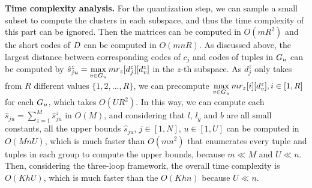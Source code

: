  
 
 
 

 
 
 \noindent \textbf{Time complexity analysis.}
 For the quantization step, we can sample a small subset to compute the clusters in each subspace, and thus the time complexity of this part can be ignored. 
 Then the matrices can be computed in $O(mR^2)$ and the short codes of $D$ can be computed in $O(mnR)$. 
 As discussed above,  the largest distance between corresponding codes of  $c_j$ and codes of tuples in $G_u$ can be computed by $\hat{s}_{ju}^z = \max\limits_{v\in G_u}mr_z[d_{j}^z][d_v^z]$ in the $z$-th subspace. 
 As $d_j^z$ only takes from $R$ different values $\{1, 2, \dots, R\}$, we can precompute $\max\limits_{v\in G_u}mr_z[i][d_v^z], i\in[1, R]$ for each $G_u$, which takes $O(UR^2)$. In this way, we can compute each $\hat{s}_{ju}=\sum_{z=1}^{M}\hat{s}^z_{ju}$ in $O(M)$, and considering that $l$, $l_g$ and  $b$ are all small constants, all the upper bounds $\hat{s}_{ju}$, $j\in [1,N]$, $u\in [1,U]$ can be computed in  $O(MnU)$, which is much faster than $O(mn^2)$ that enumerates every tuple and tuples in each group to compute the upper bounds, because $m \ll M$ and $U \ll n$. %
 Then, 
 considering the three-loop framework, the overall time complexity is $O(KhU)$, which is much faster than the $O(Khn)$ because $U \ll n$.
%
 
